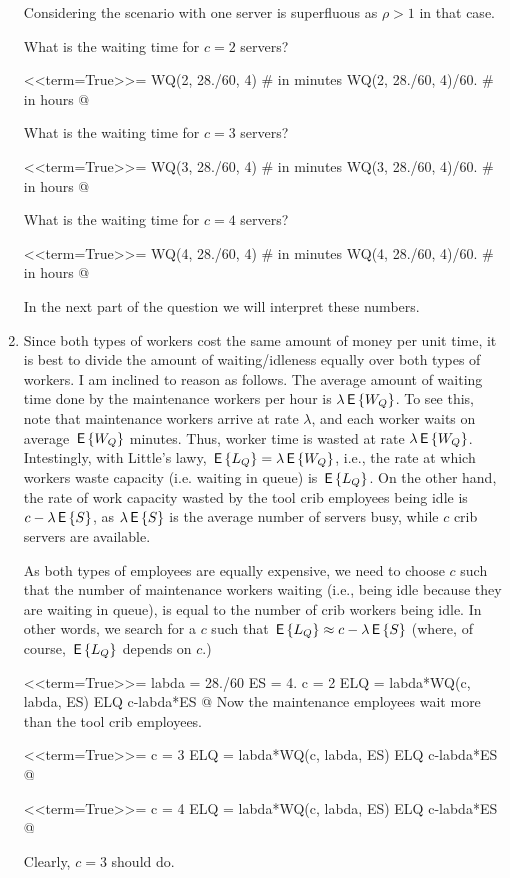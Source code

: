 \begin{question}
\begin{solution}
\begin{enumerate}
Considering the scenario with one server is superfluous as $\rho>1$ in
that case.

What is the waiting time for $c=2$ servers?

<<term=True>>=
WQ(2, 28./60, 4) # in minutes
WQ(2, 28./60, 4)/60. # in hours
@

What is the waiting time for $c=3$ servers?

<<term=True>>=
WQ(3, 28./60, 4)   # in minutes
WQ(3, 28./60, 4)/60. # in hours
@


What is the waiting time for $c=4$ servers?

<<term=True>>=
WQ(4, 28./60, 4) # in minutes
WQ(4, 28./60, 4)/60. # in hours
@ 

In the next  part of the question we will interpret these numbers.

\item 
Since both types of workers cost the same amount of money per unit
time, it is best to divide the amount of waiting/idleness equally over
both types of workers.  I am inclined to reason as follows. The
average amount of waiting time done by the maintenance workers per
hour is $\lambda \,\mathsf{E}\left\{W_Q\right\}$. To see this, note that maintenance workers arrive at rate $\lambda$, and each worker waits on average $\,\mathsf{E}\left\{W_Q\right\}$ minutes. Thus, worker time is wasted at rate $\lambda \,\mathsf{E}\left\{W_Q\right\}$. Intestingly, with Little's lawy, $\,\mathsf{E}\left\{L_Q\right\}=\lambda \,\mathsf{E}\left\{W_Q\right\}$, i.e., the rate at which workers waste capacity (i.e.  waiting in queue) is $\,\mathsf{E}\left\{L_Q\right\}$. On the other hand, the  rate of work capacity wasted by the tool crib employees being idle is $c-\lambda \,\mathsf{E}\left\{S\right\}$, as $\lambda \,\mathsf{E}\left\{S\right\}$ is the average number of servers busy, while $c$ crib servers are available.

As both types of
employees are equally expensive, we need to choose $c$ such that
the number of maintenance workers waiting (i.e., being idle because they are waiting in queue), is  equal to the number of crib workers being idle. In other words, we search for a $c$ such that $\,\mathsf{E}\left\{L_Q\right\} \approx c- \lambda \,\mathsf{E}\left\{S\right\}$ (where, of course, $\,\mathsf{E}\left\{L_Q\right\}$ depends on $c$.)


<<term=True>>=
labda = 28./60
ES = 4.
c = 2
ELQ = labda*WQ(c, labda, ES)
ELQ
c-labda*ES
@ 
Now the maintenance employees wait more than the tool crib employees.

<<term=True>>=
c = 3
ELQ = labda*WQ(c, labda, ES)
ELQ
c-labda*ES
@ 

<<term=True>>=
c = 4
ELQ = labda*WQ(c, labda, ES)
ELQ
c-labda*ES
@ 

Clearly, $c=3$ should do.
  \end{enumerate}
    \end{solution}
\end{question}

